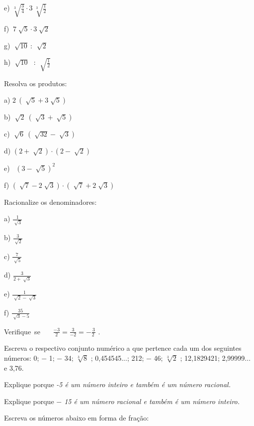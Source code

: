 \begin{exercicios}
\begin{multicols}{4}
		e)  \( \sqrt[3]{\frac{3}{4}} \cdot 3~ \sqrt[3]{\frac{1}{2}} \)
		
		f)  \( ~7 \sqrt[]{5}  \cdot  3 \sqrt[]{2} \)
		
		g)  \( \sqrt[]{10}~:~\sqrt[]{2} \)
		
		h)  \( \sqrt[]{10}\text{~ : }\sqrt[]{\frac{1}{2}} \) 
\end{multicols}
	\exitem{} Resolva os produtos:

\begin{multicols}{2}
	a) \( 2~ \left( \sqrt[]{5}+3\sqrt[]{5} \right)  \)
	
	b)  \( \sqrt[]{2}~ \left( \sqrt[]{3}+\sqrt[]{5} \right)  \)
	
	c)  \( \sqrt[]{6}~ \left( \sqrt[]{32}-\sqrt[]{3} \right)  \)
	
	d)  \(  \left( 2+\sqrt[]{2} \right)  \cdot  \left( 2-\sqrt[]{2} \right)  \)
	
	e)~  \(  \left( 3-\sqrt[]{5} \right) ^{2} \)
	
	f)  \(  \left( \sqrt[]{7}-2\sqrt[]{3} \right)  \cdot  \left( \sqrt[]{7}+2\sqrt[]{3} \right)  \)
\end{multicols}

	\exitem{} Racionalize os denominadores:

\begin{multicols}{5}

	a) \( \frac{1}{\sqrt[]{3}} \)
	
	b)  \( \frac{3}{\sqrt[]{2}} \)
	
	c)  \( \frac{7}{\sqrt[]{5}} \)
	
	d)  \( \frac{3}{2+\sqrt[]{3}} \)
	
	e)  \( \frac{1}{\sqrt[]{2}-\sqrt[]{3}} \)
	
	f)  \( \frac{35}{\sqrt[]{3}-5} \)
\end{multicols}

\exitem{} Verifique~se~~~   \( \frac{-3}{2}=\frac{3}{-2}=-\frac{3}{2~} \) .

\exitem{} Escreva o respectivo conjunto numérico a que pertence cada um dos seguintes números:  0; $-$ 1; $-$ 34;  \( \sqrt[3]{8} \) ; 0,454545...; 212; $-$ 46;  \( \sqrt[3]{2} \) ; 12,1829421; 2,99999... e 3,76.

\exitem{} Explique porque \textit{-5 é um número inteiro e também é um número racional.}

\exitem{} Explique porque \textit{$-$ 15 é um número racional e também é um número inteiro.}

\exitem{} Escreva os números abaixo em forma de fração:
\begin{multicols}{3}
	

\end{multicols}
\end{exercicios}
